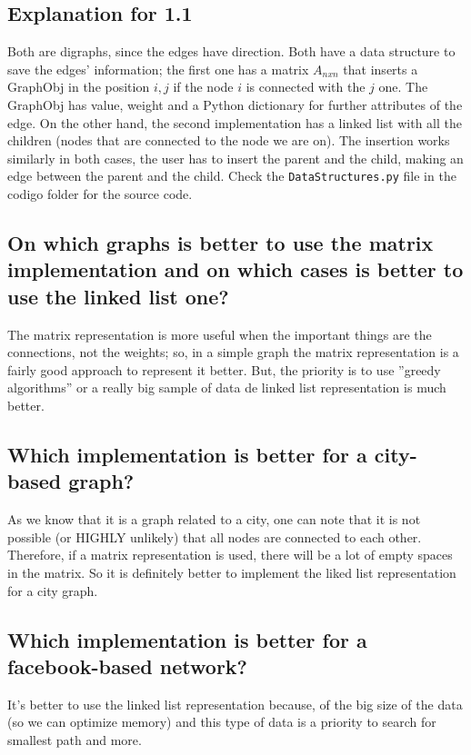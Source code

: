 \documentclass[a4paper,12pt]{article}
\begin{document}
    \subsection{Explanation for 1.1}
    Both are digraphs, since the edges have direction. Both have a data structure
    to save the edges' information; the first one has a matrix $A_{nxn}$ that inserts
    a GraphObj in the position $i,j$ if the node $i$ is connected with the $j$ one. The GraphObj
    has value, weight and a Python dictionary for further attributes of the edge. On the
    other hand, the second implementation has a linked list with all the children (nodes that
    are connected to the node we are on). The insertion works similarly in both cases, the user has
    to insert the parent and the child, making an edge between the parent and the child. Check the
    \texttt{DataStructures.py} file in the codigo folder for the source code.

    \subsection{On which graphs is better to use the matrix implementation and on
    which cases is better to use the linked list one?}
    The matrix representation is more useful when the important things are the
    connections, not the weights; so, in a simple graph the matrix representation
    is a fairly good approach to represent it better. But, the priority is to use
    ''greedy algorithms'' or a really big sample of data de linked list
    representation is much better.

    \subsection{Which implementation is better for a city-based graph?}
    As we know that it is a graph related to a city, one can note that it is not possible
    (or HIGHLY unlikely) that all nodes are connected to each other. Therefore, if a matrix
    representation is used, there will be a lot of empty spaces in the matrix. So it is definitely
    better to implement the liked list representation for a city graph.

    \subsection{Which implementation is better for a facebook-based network?}
    It's better to use the linked list representation because, of the big size
    of the data (so we can optimize memory) and this type of data is a priority to
    search for smallest path and more.
\end{document}
